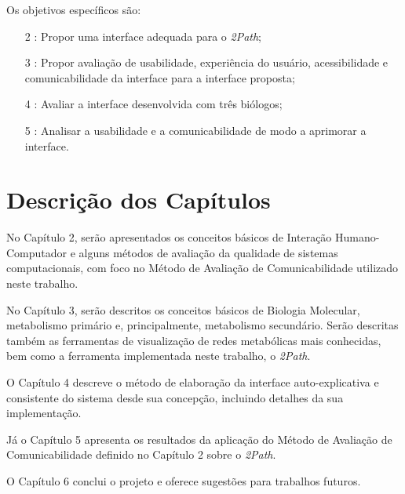 \indent Os objetivos específicos são:
\begin{itemize}
\item[2]: Propor uma interface adequada para o \textit{2Path};
\item[3]: Propor avaliação de usabilidade, experiência do usuário, acessibilidade e comunicabilidade da interface para a interface proposta;
\item[4]: Avaliar a interface desenvolvida com três biólogos;
\item[5]: Analisar a usabilidade e a comunicabilidade de modo a aprimorar a interface.
\end{itemize}

\section{Descrição dos Capítulos}
\indent No Capítulo 2, serão apresentados os conceitos básicos de Interação Humano-Computador e alguns métodos de avaliação da qualidade de sistemas computacionais, com foco no Método de Avaliação de Comunicabilidade utilizado neste trabalho.

\indent No Capítulo 3, serão descritos os conceitos básicos de Biologia Molecular, metabolismo primário e, principalmente, metabolismo secundário. Serão descritas também as ferramentas de visualização de redes metabólicas mais conhecidas, bem como a ferramenta implementada neste trabalho, o \textit{2Path}.

\indent O Capítulo 4 descreve o método de elaboração da interface auto-explicativa e consistente do sistema desde sua concepção, incluindo detalhes da sua implementação.

\indent Já o Capítulo 5 apresenta os resultados da aplicação do Método de Avaliação de Comunicabilidade definido no Capítulo 2 sobre o \textit{2Path}.

\indent O Capítulo 6  conclui o projeto e oferece sugestões para trabalhos futuros.